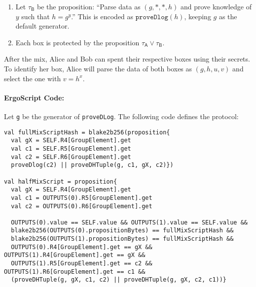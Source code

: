 \documentclass[11pt]{article}
\newcommand{\langname}{ErgoScript\xspace}
\newcommand{\mixname}{ErgoMix\xspace}
\begin{document}
\begin{enumerate}
\begin{enumerate}
		\item Let $\tau_{\textsf{B}}$ be the proposition: ``Parse data as $(g, *, *, h)$ and
		prove knowledge of $y$ such that $h = {g}^{y}$.'' 
		This is encoded as $\texttt{proveDlog}(h)$, keeping $g$ as the default generator.
		
		\item Each box is protected by the proposition $\tau_\textsf{A} \lor \tau_\textsf{B}$. 
		
	\end{enumerate}

\end{enumerate}
	After the mix, Alice and Bob can spent their respective boxes using their secrets. 
	To identify her box, Alice will parse the data of both boxes as $(g, h, u, v)$ and select the one with $v = h^x$. 

\paragraph{\langname Code:} Let \texttt{g} be the generator of \texttt{proveDLog}. The following code defines the protocol:
\begin{verbatim}
val fullMixScriptHash = blake2b256(proposition{
  val gX = SELF.R4[GroupElement].get
  val c1 = SELF.R5[GroupElement].get
  val c2 = SELF.R6[GroupElement].get
  proveDlog(c2) || proveDHTuple(g, c1, gX, c2)})

val halfMixScript = proposition{
  val gX = SELF.R4[GroupElement].get
  val c1 = OUTPUTS(0).R5[GroupElement].get
  val c2 = OUTPUTS(0).R6[GroupElement].get

  OUTPUTS(0).value == SELF.value && OUTPUTS(1).value == SELF.value &&
  blake2b256(OUTPUTS(0).propositionBytes) == fullMixScriptHash &&
  blake2b256(OUTPUTS(1).propositionBytes) == fullMixScriptHash &&
  OUTPUTS(0).R4[GroupElement].get == gX && OUTPUTS(1).R4[GroupElement].get == gX &&
  OUTPUTS(1).R5[GroupElement].get == c2 && OUTPUTS(1).R6[GroupElement].get == c1 &&
  (proveDHTuple(g, gX, c1, c2) || proveDHTuple(g, gX, c2, c1))}
\end{verbatim}
\end{document}
